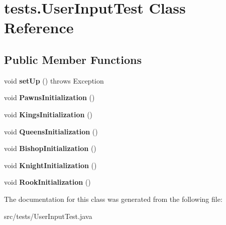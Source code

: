 \hypertarget{classtests_1_1_user_input_test}{\section{tests.\-User\-Input\-Test Class Reference}
\label{classtests_1_1_user_input_test}
}
\subsection*{Public Member Functions}
\begin{DoxyCompactItemize}
\item 
\hypertarget{classtests_1_1_user_input_test_a4c021e0742072fc53392b8b073fabe1a}{void {\bfseries set\-Up} ()  throws Exception }\label{classtests_1_1_user_input_test_a4c021e0742072fc53392b8b073fabe1a}

\item 
\hypertarget{classtests_1_1_user_input_test_a7353aaa8a055df96bf1edef01a687999}{void {\bfseries Pawns\-Initialization} ()}\label{classtests_1_1_user_input_test_a7353aaa8a055df96bf1edef01a687999}

\item 
\hypertarget{classtests_1_1_user_input_test_a901f0de968c85039fdc240205c52ec38}{void {\bfseries Kings\-Initialization} ()}\label{classtests_1_1_user_input_test_a901f0de968c85039fdc240205c52ec38}

\item 
\hypertarget{classtests_1_1_user_input_test_a4c839bd90d11d394a3b8d1ef23a6851c}{void {\bfseries Queens\-Initialization} ()}\label{classtests_1_1_user_input_test_a4c839bd90d11d394a3b8d1ef23a6851c}

\item 
\hypertarget{classtests_1_1_user_input_test_a790478b6bea278b686efb7c16c790533}{void {\bfseries Bishop\-Initialization} ()}\label{classtests_1_1_user_input_test_a790478b6bea278b686efb7c16c790533}

\item 
\hypertarget{classtests_1_1_user_input_test_af0a53ba70f8274ebcd4a4d46c4fc9a0e}{void {\bfseries Knight\-Initialization} ()}\label{classtests_1_1_user_input_test_af0a53ba70f8274ebcd4a4d46c4fc9a0e}

\item 
\hypertarget{classtests_1_1_user_input_test_ac1adc1b09f149bcd85db471ab9a9e66c}{void {\bfseries Rook\-Initialization} ()}\label{classtests_1_1_user_input_test_ac1adc1b09f149bcd85db471ab9a9e66c}

\end{DoxyCompactItemize}


The documentation for this class was generated from the following file\-:\begin{DoxyCompactItemize}
\item 
src/tests/User\-Input\-Test.\-java\end{DoxyCompactItemize}
